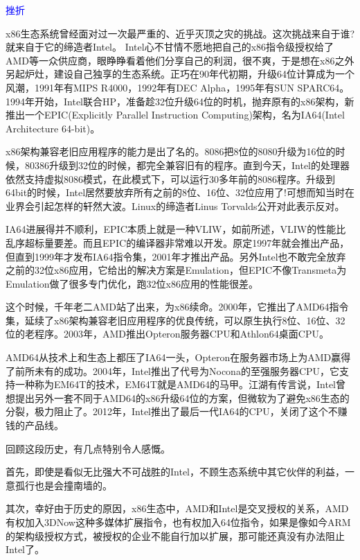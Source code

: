 \documentclass[utf8]{book}
\begin{document}
	\begin{flushleft}
		{\large \textcolor{blue}{挫折}}
	\end{flushleft}
	
	x86生态系统曾经面对过一次最严重的、近乎灭顶之灾的挑战。这次挑战来自于谁?就来自于它的缔造者Intel。
	Intel心不甘情不愿地把自己的x86指令级授权给了AMD等一众供应商，眼睁睁看着他们分享自己的利润，很不爽，于是想在x86之外另起炉灶，建设自己独享的生态系统。正巧在90年代初期，升级64位计算成为一个风潮，1991年有MIPS R4000，1992年有DEC Alpha，1995年有SUN SPARC64。1994年开始，Intel联合HP，准备趁32位升级64位的时机，抛弃原有的x86架构，新推出一个EPIC(Explicitly Parallel Instruction Computing)架构，名为IA64(Intel Architecture 64-bit)。
	
	x86架构兼容老旧应用程序的能力是出了名的。8086把8位的8080升级为16位的时候，80386升级到32位的时候，都完全兼容旧有的程序。直到今天，Intel的处理器依然支持虚拟8086模式，在此模式下，可以运行30多年前的8086程序。升级到64bit的时候，Intel居然要放弃所有之前的8位、16位、32位应用了!可想而知当时在业界会引起怎样的轩然大波。Linux的缔造者Linus Torvalds公开对此表示反对。
	
	IA64进展得并不顺利，EPIC本质上就是一种VLIW，如前所述，VLIW的性能比乱序超标量要差。而且EPIC的编译器非常难以开发。原定1997年就会推出产品，但直到1999年才发布IA64指令集，2001年才推出产品。另外Intel也不敢完全放弃之前的32位x86应用，它给出的解决方案是Emulation，但EPIC不像Transmeta为Emulation做了很多专门优化，跑32位x86应用的性能很差。
	
	这个时候，千年老二AMD站了出来，为x86续命。2000年，它推出了AMD64指令集，延续了x86架构兼容老旧应用程序的优良传统，可以原生执行8位、16位、32位的老程序。2003年，AMD推出Opteron服务器CPU和Athlon64桌面CPU。
	
	AMD64从技术上和生态上都压了IA64一头，Opteron在服务器市场上为AMD赢得了前所未有的成功。2004年，Intel推出了代号为Nocona的至强服务器CPU，它支持一种称为EM64T的技术，EM64T就是AMD64的马甲。江湖有传言说，Intel曾想提出另外一套不同于AMD64的x86升级64位的方案，但微软为了避免x86生态的分裂，极力阻止了。2012年，Intel推出了最后一代IA64的CPU，关闭了这个不赚钱的产品线。
	
	回顾这段历史，有几点特别令人感慨。
	
	首先，即使是看似无比强大不可战胜的Intel，不顾生态系统中其它伙伴的利益，一意孤行也是会撞南墙的。
	
	其次，幸好由于历史的原因，x86生态中，AMD和Intel是交叉授权的关系，AMD有权加入3DNow这种多媒体扩展指令，也有权加入64位指令，如果是像如今ARM的架构级授权方式，被授权的企业不能自行加以扩展，那可能还真没有办法阻止Intel了。
	
\end{document}

